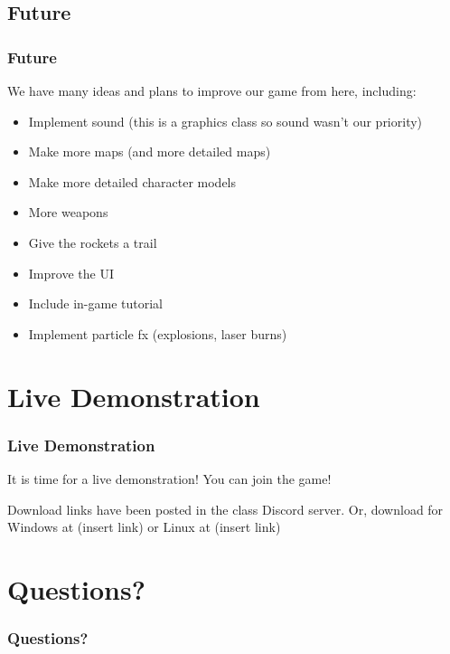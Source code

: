 \documentclass{beamer}
\begin{document}
\subsection{Future}
\begin{frame}
\frametitle{Future}
We have many ideas and plans to improve our game from here, including:
    \begin{itemize}
        \item Implement sound (this is a graphics class so sound wasn't our priority)
        \item Make more maps (and more detailed maps)
        \item Make more detailed character models
        \item More weapons
        \item Give the rockets a trail 🚀
        \item Improve the UI
        \item Include in-game tutorial
        \item Implement particle fx (explosions, laser burns)
    \end{itemize}

\end{frame}

\section{Live Demonstration}

\begin{frame}
\frametitle{Live Demonstration}
It is time for a live demonstration! You can join the game!

    Download links have been posted in the class Discord server. Or, download for Windows at (insert link) or Linux at (insert link)
\end{frame}

\section{Questions?}

\begin{frame}
\frametitle{Questions?}
\end{frame}
\end{document}
